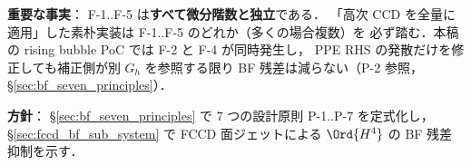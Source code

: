 \noindent\textbf{重要な事実}：
F-1..F-5 は\textbf{すべて微分階数と独立}である．
「高次 CCD を全量に適用」した素朴実装は F-1..F-5 のどれか（多くの場合複数）を
必ず踏む．本稿の rising bubble PoC では F-2 と F-4 が同時発生し，
PPE RHS の発散だけを修正しても補正側が別 $G_h$ を参照する限り
BF 残差は減らない（P-2 参照，\S\ref{sec:bf_seven_principles}）．

\noindent\textbf{方針}：
§\ref{sec:bf_seven_principles} で 7 つの設計原則 P-1..P-7 を定式化し，
§\ref{sec:fccd_bf_sub_system} で FCCD 面ジェットによる
$\Ord{H^4}$ の BF 残差抑制を示す．

